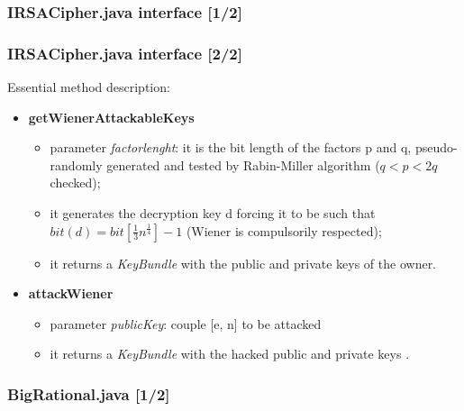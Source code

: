 \documentclass{beamer}
\begin{document}
  
\begin{frame}
  \frametitle{IRSACipher.java interface [1/2]}
    
    \lstset{basicstyle=\tiny}
    
    
  \end{frame}
  
  \begin{frame}
  \frametitle{IRSACipher.java interface [2/2]}
  
  Essential method description:
    
    \begin{itemize}
    	\item \textbf{getWienerAttackableKeys}
    	\begin{itemize}
    		\item parameter \textit{factorlenght}: it is the bit length of the factors p and q, pseudo-randomly generated and tested by Rabin-Miller algorithm ($q < p < 2q$ checked);
    		\item it generates the decryption key d forcing it to be such that $bit(d) = bit[\frac{1}{3}{n}^{\frac{1}{4}}] - 1$ (Wiener is compulsorily respected);
    		\item it returns a \textit{KeyBundle} with the public and private keys of the owner.
    	\end{itemize}
    	
    	\item \textbf{attackWiener}
    	\begin{itemize}
    		\item parameter \textit{publicKey}: couple [e, n] to be attacked
    		\item it returns a \textit{KeyBundle} with the hacked public and private keys .
    	\end{itemize}
    \end{itemize}
    
  \end{frame}
  
  \begin{frame}
  \frametitle{BigRational.java [1/2]}
    
    \lstset{basicstyle=\tiny}
    
    
  \end{frame}
  
\end{document}
